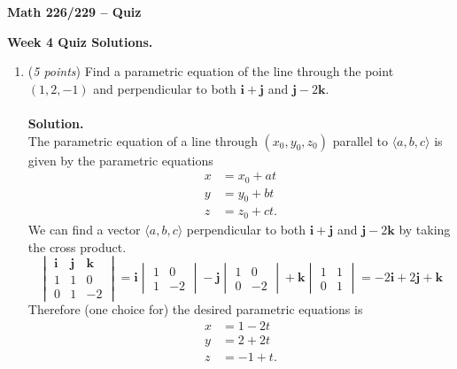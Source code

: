 \documentclass[12 pt]{article}
\begin{document}
	\begin{center}
		\textbf{\hfill Math 226/229 -- Quiz} \\
	\end{center}
	\medskip

	\noindent
	\textbf{Week 4 Quiz Solutions.} \hfill
	\vspace{.1in}
	\hspace*{0.2in}
	\medskip
	\noindent
	\begin{enumerate}
		\item (\textit{5 points})
    Find a parametric equation of the line through the point $(1, 2, -1)$ and
    perpendicular to both $\mathbf{i} + \mathbf{j}$ and
    $\mathbf{j} - 2\mathbf{k}$.
		\\~\\
    \textbf{Solution.}
		\\
		The parametric equation of a line through $(x_0, y_0, z_0)$ parallel to
		$\langle a, b, c\rangle$ is given by the parametric equations \begin{align*}
			x &= x_0 + at \\
			y &= y_0 + bt \\
			z &= z_0 + ct.
		\end{align*}
		We can find a vector $\langle a, b, c \rangle$ perpendicular to both
		$\mathbf{i} + \mathbf{j}$ and $\mathbf{j} - 2\mathbf{k}$ by taking the cross
		product. \[
			\begin{vmatrix}
				\mathbf i & \mathbf j & \mathbf k \\
				1 & 1 & 0 \\
				0 & 1 & -2
			\end{vmatrix}
			= \mathbf i \begin{vmatrix} 1 & 0 \\ 1 & -2 \end{vmatrix}
			- \mathbf j \begin{vmatrix} 1 & 0 \\ 0 & -2 \end{vmatrix}
			+ \mathbf k \begin{vmatrix} 1 & 1 \\ 0 & 1 \end{vmatrix}
			= -2\mathbf i + 2\mathbf j + \mathbf k
		\]
		Therefore (one choice for) the desired parametric equations is \begin{align*}
			x &= 1 - 2t \\
			y &= 2 + 2t \\
			z &= -1 + t.
		\end{align*}

\end{enumerate}
\end{document}
